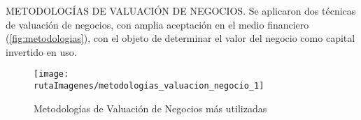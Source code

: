 %
%

\textcolor{secundario}{METODOLOG\'IAS DE VALUACI\'ON DE NEGOCIOS}. Se aplicaron dos t\'ecnicas de valuaci\'on de negocios, con amplia aceptaci\'on en el medio financiero (\autoref{fig:metodologias}), con el objeto de determinar el valor del negocio como capital invertido en uso.\\

\begin{figure}[H]
\centering
\caption{Metodolog\'ias de Valuaci\'on de Negocios m\'as utilizadas\label{fig:metodologias}}
\texttt{[image: \\rutaImagenes/metodologias\_valuacion\_negocio\_1]}\\

\end{figure}
